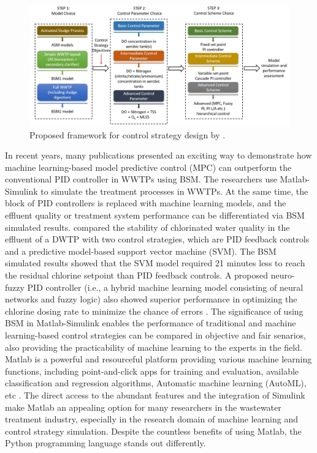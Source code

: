 \begin{figure}[h]
   \centering
   \includegraphics[width=0.9\columnwidth]{imgs/propose-frameworks-for-control-strategy-design.png}
   \caption{Proposed framework for control strategy design by \citet{ballhysaWastewaterTreatmentPlant2020}.}
   \label{fig:control-strategy-design}
\end{figure}
 
In recent years, many publications presented an exciting way to demonstrate how machine learning-based model predictive control (MPC) can outperform the conventional PID controller in WWTPs using BSM. The researchers use Matlab-Simulink to simulate the treatment processes in WWTPs. At the same time, the block of PID controllers is replaced with machine learning models, and the effluent quality or treatment system performance can be differentiated via BSM simulated results. \citet{wangModelPredictiveControl2020} compared the stability of chlorinated water quality in the effluent of a DWTP with two control strategies, which are PID feedback controls and a predictive model-based support vector machine (SVM). The BSM simulated results showed that the SVM model required 21 minutes less to reach the residual chlorine setpoint than PID feedback controls. A proposed neuro-fuzzy PID controller (i.e., a hybrid machine learning model consisting of neural networks and fuzzy logic) also showed superior performance in optimizing the chlorine dosing rate to minimize the chance of errors \citep{hongApplicationNeurofuzzyPID2012}. The significance of using BSM in Matlab-Simulink enables the performance of traditional and machine learning-based control strategies can be compared in objective and fair senarios, also providing the practicability of machine learning to the experts in the field. Matlab is a powerful and resourceful platform providing various machine learning functions, including point-and-click apps for training and evaluation, available classification and regression algorithms, Automatic machine learning (AutoML), etc \citep{mathworksMATLABMachineLearning2022}. The direct access to the abundant features and the integration of Simulink make Matlab an appealing option for many researchers in the wastewater treatment industry, especially in the research domain of machine learning and control strategy simulation. Despite the countless benefits of using Matlab, the Python programming language stands out differently.

